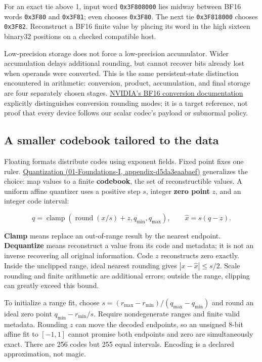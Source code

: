 For an exact tie above 1, input word \texttt{0x3F808000} lies midway between BF16 words \texttt{0x3F80} and \texttt{0x3F81}; even chooses \texttt{0x3F80}. The next tie \texttt{0x3F818000} chooses \texttt{0x3F82}. Reconstruct a BF16 finite value by placing its word in the high sixteen binary32 positions on a checked compatible host.

Low-precision storage does not force a low-precision accumulator. Wider accumulation delays additional rounding, but cannot recover bits already lost when operands were converted. This is the same persistent-state distinction encountered in arithmetic: conversion, product, accumulation, and final storage are four separately chosen stages. \href{https://docs.nvidia.com/cuda/cuda-math-api/cuda_math_api/group__CUDA__MATH____BFLOAT16__MISC.html}{NVIDIA's BF16 conversion documentation} explicitly distinguishes conversion rounding modes; it is a target reference, not proof that every device follows our scalar codec's payload or subnormal policy.

\subsection{A smaller codebook tailored to the data}\label{05-engine-i-ch001-a-smaller-codebook-tailored-to-the-data}

Floating formats distribute codes using exponent fields. Fixed point fixes one ruler. \href{../01-Foundations-I/main.pdf\#nameddest=appendix-d5da3eaabaef}{Quantization (01-Foundations-I, appendix-d5da3eaabaef)} generalizes the choice: map values to a finite \textbf{codebook}, the set of reconstructible values. A uniform affine quantizer uses a positive step \(s\), integer \textbf{zero point} \(z\), and an integer code interval:

\[
q=\operatorname{clamp}\!\left(\operatorname{round}(x/s)+z,q_{\min},q_{\max}\right),
\qquad
\widehat x=s(q-z).
\]

\textbf{Clamp} means replace an out-of-range result by the nearest endpoint. \textbf{Dequantize} means reconstruct a value from its code and metadata; it is not an inverse recovering all original information. Code \(z\) reconstructs zero exactly. Inside the unclipped range, ideal nearest rounding gives \(|x-\widehat x|\le s/2\). Scale rounding and finite arithmetic are additional errors; outside the range, clipping can greatly exceed this bound.

To initialize a range fit, choose \(s=(r_{\max}-r_{\min})/(q_{\max}-q_{\min})\) and round an ideal zero point \(q_{\min}-r_{\min}/s\). Require nondegenerate ranges and finite valid metadata. Rounding \(z\) can move the decoded endpoints, so an unsigned 8-bit affine fit to \([-1,1]\) cannot promise both endpoints and zero are simultaneously exact. There are 256 codes but 255 equal intervals. Encoding is a declared approximation, not magic.

